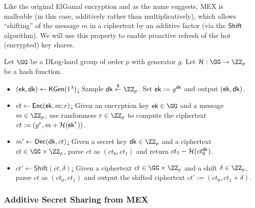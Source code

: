 Like the original ElGamal encryption and as the name suggests, MEX is malleable (in this case, additively rather than multiplicatively), which allows ``shifting'' of the message $m$ in a ciphertext by an additive factor (via the $\sf Shift$ algorithm). We will use this property to enable proactive refresh of the hot (encrypted) key shares.

\begin{construction}[\mex]\label{con:enc}
Let $\GG$ be a DLog-hard group of order $p$ with generator $g$. 
Let $\lhlhash: \GG \rightarrow \ZZ_p$ be a hash function. 
\begin{itemize}
\item \underline{$(\mathsf{ek}, \mathsf{dk}) \gets \mathsf{KGen}(1^\lambda)$:}
Sample $\dk \sample \ZZ_p$. Set $\mathsf{ek} := g^{\mathsf{dk}}$ and output $(\mathsf{ek}, \mathsf{dk})$.

\item \underline{$ct \gets \mathsf{Enc}(\mathsf{ek}, m; r)$:}
Given an encryption key $\ek \in \GG$ and a message $m \in \ZZ_p$, use randomness $r \in \ZZ_p$ to compute the ciphertext $ct := (g^r, m + \mathcal{H}(\mathsf{ek}^r))$.

\item \underline{$m' \gets \mathsf{Dec}(\mathsf{dk}, ct)$:}
Given a secret key $\dk \in \ZZ_p$ and a ciphertext $ct \in \GG \times\ZZ_p$, parse $ct$ as $(ct_0, ct_1)$ and return $ct_1 - \mathcal{H}(ct_0^{\mathsf{dk}})$.

\item \underline{$ct' \gets \mathsf{Shift}(ct, \delta)$:}
Given a ciphertext $ct \in \GG \times \ZZ_p$ and a shift $\delta \in \ZZ_p$, parse $ct$ as $(ct_0, ct_1)$ and output the shifted ciphertext $ct' := (ct_0, ct_1 + \delta)$.
\end{itemize}
\end{construction}

\subsubsection{Additive Secret Sharing from MEX}

